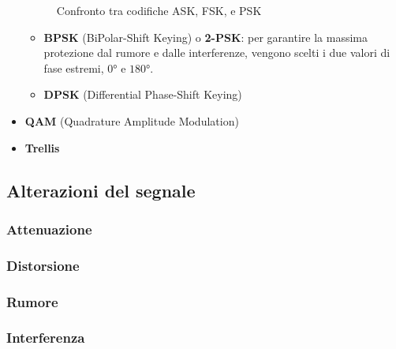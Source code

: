 \documentclass[a4paper,11pt]{article}
\def\sub#1{\subsection{#1}\label{#1}}
\def\subsub#1{\subsubsection{#1}\label{#1}}
\begin{document}
\begin{itemize}
\begin{figure}[h]
\caption{Confronto tra codifiche ASK, FSK, e PSK}
\label{fig. 5}
\end{figure}
\begin{itemize}
\item \textbf{BPSK} (BiPolar-Shift Keying) o \textbf{2-PSK}: per garantire la massima protezione dal rumore e dalle interferenze, vengono scelti i due valori di fase estremi, $\ang{0}$ e $\ang{180}$.
\item \textbf{DPSK} (Differential Phase-Shift Keying)
\end{itemize}
\item \textbf{QAM} (Quadrature Amplitude Modulation)
\item \textbf{Trellis}
\end{itemize}
\sub{Alterazioni del segnale}
\subsub{Attenuazione}
\subsub{Distorsione}
\subsub{Rumore}
\subsub{Interferenza}
\end{document}
